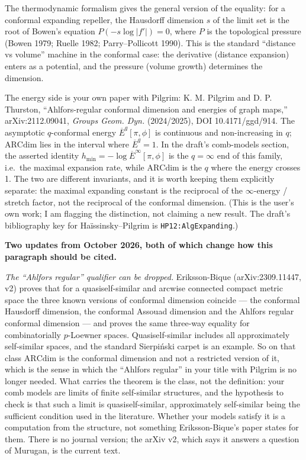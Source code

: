 \documentclass[
]{article}
\begin{document}
The thermodynamic formalism gives the general version of the equality:
for a conformal expanding repeller, the Hausdorff dimension \(s\) of the
limit set is the root of Bowen's equation \(P(-s\log|f'|)=0\), where
\(P\) is the topological pressure (Bowen 1979; Ruelle 1982;
Parry--Pollicott 1990). This is the standard ``distance vs volume''
machine in the conformal case: the derivative (distance expansion)
enters as a potential, and the pressure (volume growth) determines the
dimension.

The energy side is your own paper with Pilgrim: K. M. Pilgrim and D. P.
Thurston, ``Ahlfors-regular conformal dimension and energies of graph
maps,'' arXiv:2112.09041, \emph{Groups Geom. Dyn.} (2024/2025), DOI
10.4171/ggd/914. The asymptotic \(q\)-conformal energy
\(\overline E^q[\pi,\phi]\) is continuous and non-increasing in \(q\);
\(\mathrm{ARCdim}\) lies in the interval where \(\overline E^q=1\). In
the draft's comb-models section, the asserted identity
\(h_{\min}=-\log\overline E^\infty[\pi,\phi]\) is the \(q=\infty\) end
of this family, i.e.~the maximal expansion rate, while
\(\mathrm{ARCdim}\) is the \(q\) where the energy crosses 1. The two are
different invariants, and it is worth keeping them explicitly separate:
the maximal expanding constant is the reciprocal of the
\(\infty\)-energy / stretch factor, not the reciprocal of the conformal
dimension. (This is the user's own work; I am flagging the distinction,
not claiming a new result. The draft's bibliography key for
Ha\"{i}ssinsky--Pilgrim is \texttt{HP12:AlgExpanding}.)

\textbf{Two updates from October 2026, both of which change how this
paragraph should be cited.}

\emph{The ``Ahlfors regular'' qualifier can be dropped.} Eriksson-Bique
(arXiv:2309.11447, v2) proves that for a quasiself-similar and arcwise
connected compact metric space the three known versions of conformal
dimension coincide --- the conformal Hausdorff dimension, the conformal
Assouad dimension and the Ahlfors regular conformal dimension --- and
proves the same three-way equality for combinatorially \(p\)-Loewner
spaces. Quasiself-similar includes all approximately self-similar
spaces, and the standard Sierpi\'{n}ski carpet is an example. So on that
class \(\mathrm{ARCdim}\) is the conformal dimension and not a
restricted version of it, which is the sense in which the ``Ahlfors
regular'' in your title with Pilgrim is no longer needed. What carries
the theorem is the class, not the definition: your comb models are
limits of finite self-similar structures, and the hypothesis to check is
that such a limit is quasiself-similar, approximately self-similar being
the sufficient condition used in the literature. Whether your models
satisfy it is a computation from the structure, not something
Eriksson-Bique's paper states for them. There is no journal version; the
arXiv v2, which says it answers a question of Murugan, is the current
text.
\end{document}
